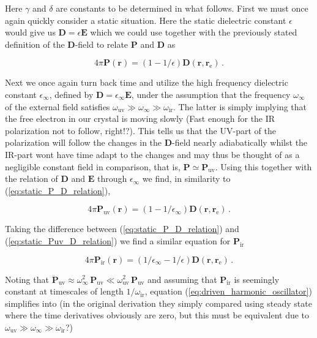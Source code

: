 \documentclass[12pt]{report}
\renewcommand{\vec}[1]{\boldsymbol{\mathbf{#1}}}                        %
\newcommand{\motivation}[1]{{\leavevmode\color{motivation}#1}}
\begin{document}
Here $ \gamma $ and $ \delta $ are constants to be determined in what follows. First we must once again quickly consider a static situation. Here the static dielectric constant $ \epsilon $ would give us $ \vec D = \epsilon \vec E $ which we could use together with the previously stated definition of the $ \vec D $-field to relate $ \vec P $ and $ \vec D $ as

\begin{equation}
	\label{eq:static_P_D_relation}
	4 \pi \vec P(\vec r) = (1 - 1/\epsilon) \vec D(\vec r, \vec r_\text{e}) \,.
\end{equation}

Next we once again turn back time and utilize the high frequency dielectric constant $ \epsilon_\infty $, defined by $ \vec D = \epsilon_\infty \vec E $, under the assumption that the frequency $ \omega_\infty $ of the external field satisfies  $ \omega_\text{uv} \gg \omega_\infty \gg \omega_\text{ir} $. The latter is simply implying that the free electron in our crystal is moving slowly \motivation{(Fast enough for the IR polarization not to follow, right!?)}. This tells us that the UV-part of the polarization will follow the changes in the $ \vec D $-field nearly adiabatically whilst the IR-part wont have time adapt to the changes and may thus be thought of as a negligible constant field in comparison, that is, $ \vec P \simeq \vec P_\text{uv} $. Using this together with the relation of $ \vec D $ and $ \vec E $ through $ \epsilon_\infty $ we find, in similarity to (\ref{eq:static_P_D_relation}),

\begin{equation}
	\label{eq:static_Puv_D_relation}
	4 \pi \vec P_\text{uv} (\vec r) =  (1 - 1/\epsilon_\infty) \vec D(\vec r, \vec r_\text{e}) \,.
\end{equation}

Taking the difference between (\ref{eq:static_P_D_relation}) and (\ref{eq:static_Puv_D_relation}) we find a similar equation for $ \vec P_\text{ir} $

\begin{equation}
	\label{eq:static_Pir_D_relation}
	4 \pi \vec P_\text{ir} (\vec r) =  (1/\epsilon_\infty - 1/\epsilon) \vec D(\vec r, \vec r_\text{e}) \,.
\end{equation}

Noting that $ \ddot{\vec P}_\text{uv} \approx \omega_\infty^2 \, \vec P_\text{uv} \ll \omega_\text{uv}^2 \, \vec P_\text{uv} $ and assuming that $ \vec P_\text{ir} $ is seemingly constant at timescales of length $ 1/\omega_\text{ir} $, equation (\ref{eq:driven_harmonic_oscillator}) simplifies into \motivation{(in the original derivation they simply compared using steady state where the time derivatives obviously are zero, but this must be equivalent due to $ \omega_\text{uv} \gg \omega_\infty \gg \omega_\text{ir} $?)}
\end{document}
